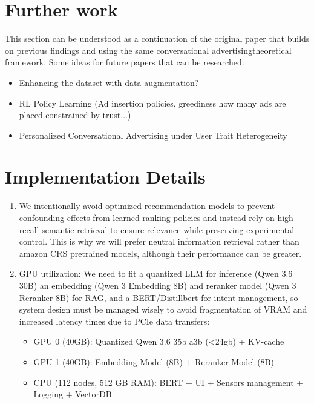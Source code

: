 \documentclass{article}
\begin{document}
\newpage


\section{Further work}

This section can be understood as a continuation of the original paper that builds on previous findings and using the same conversational advertisingtheoretical framework. Some ideas for future papers that can be researched:

\begin{itemize}
    \item Enhancing the dataset with data augmentation?
    \item RL Policy Learning (Ad insertion policies, greediness how many ads are placed constrained by trust...)
    \item Personalized Conversational Advertising under User Trait Heterogeneity
\end{itemize}

\newpage

\section{Implementation Details}

\begin{enumerate}
    \item We intentionally avoid optimized recommendation models to prevent confounding effects from learned ranking policies and instead rely on high-recall semantic retrieval to ensure relevance while preserving experimental control. This is why we will prefer neutral information retrieval rather than amazon CRS pretrained models, although their performance can be greater.

    \item GPU utilization: We need to fit a quantized LLM for inference (Qwen 3.6 30B) an embedding (Qwen 3 Embedding 8B) and reranker model (Qwen 3 Reranker 8B) for RAG, and a BERT/Distillbert for intent management, so system design must be managed wisely to avoid fragmentation of VRAM and increased latency times due to PCIe data transfers:
        \begin{itemize}
            \item GPU 0 (40GB): Quantized Qwen 3.6 35b a3b (<24gb) + KV-cache
            \item GPU 1 (40GB): Embedding Model (8B) + Reranker Model (8B) 
            \item CPU (112 nodes, 512 GB RAM): BERT + UI + Sensors management + Logging + VectorDB
        \end{itemize}
\end{enumerate}
\end{document}
